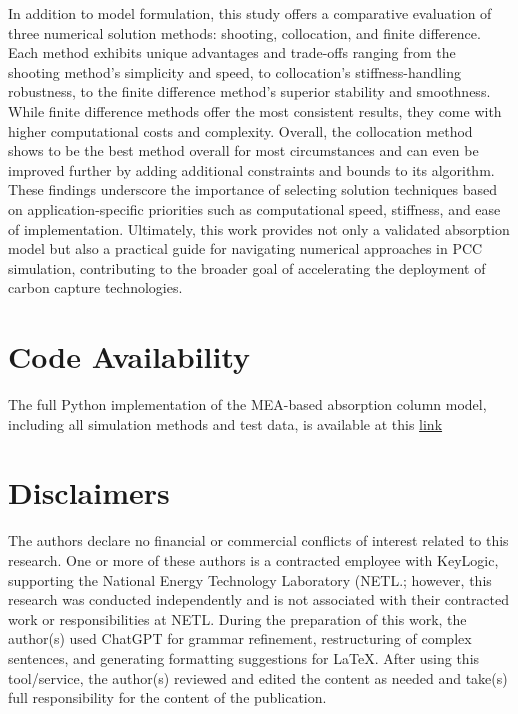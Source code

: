 \documentclass[a4paper,fleqn]{cas-sc}
\begin{document}
    In addition to model formulation, this study offers a comparative evaluation of three numerical solution methods: shooting, collocation, and finite difference. Each method exhibits unique advantages and trade-offs ranging from the shooting method's simplicity and speed, to collocation’s stiffness-handling robustness, to the finite difference method's superior stability and smoothness. While finite difference methods offer the most consistent results, they come with higher computational costs and complexity. Overall, the collocation method shows to be the best method overall for most circumstances and can even be improved further by adding additional constraints and bounds to its algorithm. These findings underscore the importance of selecting solution techniques based on application-specific priorities such as computational speed, stiffness, and ease of implementation. Ultimately, this work provides not only a validated absorption model but also a practical guide for navigating numerical approaches in PCC simulation, contributing to the broader goal of accelerating the deployment of carbon capture technologies.

    \section*{Code Availability}
    The full Python implementation of the MEA-based absorption column model, including all simulation methods and test data, is available at this
    \href{https://github.com/tannerpolley/MEA_Absorption_Column}{link}

    \section*{Disclaimers}
    The authors declare no financial or commercial conflicts of interest related to this research. One or more of these authors is a contracted employee with KeyLogic, supporting the National Energy Technology Laboratory (NETL.; however, this research was conducted independently and is not associated with their contracted work or responsibilities at NETL.
    \newline
    During the preparation of this work, the author(s) used ChatGPT for grammar refinement, restructuring of complex sentences, and generating formatting suggestions for LaTeX. After using this tool/service, the author(s) reviewed and edited the content as needed and take(s) full responsibility for the content of the publication.

    \clearpage
    
    
\end{document}
